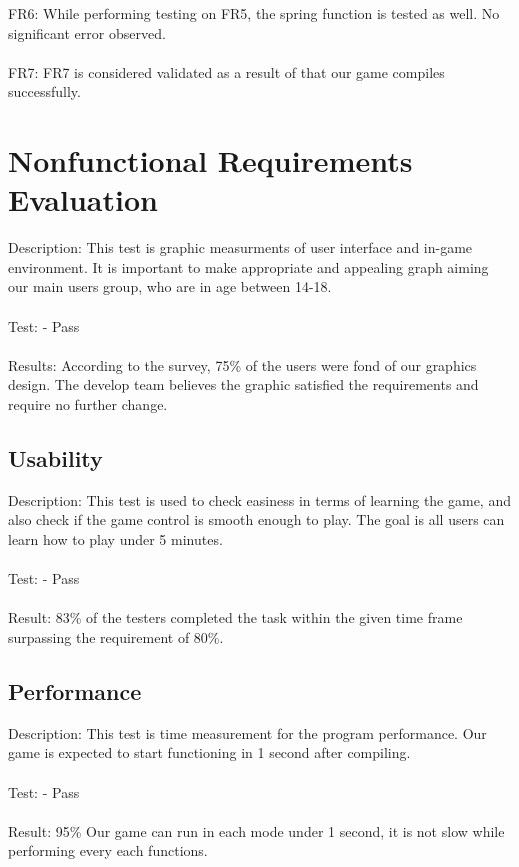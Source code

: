 \documentclass[12pt, titlepage]{article}
\begin{document}
FR6: While performing testing on FR5, the spring function is tested as well. No significant error observed.\\\\
FR7: FR7 is considered validated as a result of that our game compiles successfully.\\

\section{Nonfunctional Requirements Evaluation}

Description: This test is graphic measurments of user interface and in-game environment.  It is important to make appropriate and appealing graph aiming our main users group, who are in age between 14-18.\\\\
Test: - Pass\\\\
Results: According to the survey, 75\% of the users were fond of our graphics design.  The develop team believes the graphic satisfied the requirements and require no further change.
 

\subsection{Usability}
Description:  This test is used to check easiness in terms of learning the game, and also check if the game control is smooth enough to play.  The goal is all users can learn how to play under 5 minutes.  \\\\
Test:  - Pass\\\\
Result: 83\% of the testers completed the task within the given time frame surpassing the requirement of 80\%.


\subsection{Performance}
Description: This test is time measurement for the program performance. Our game is expected to start functioning in 1 second after compiling.\\\\
Test:  - Pass\\\\
Result: 95\% Our game can run in each mode under 1 second, it is not slow while performing every each functions.
\end{document}
